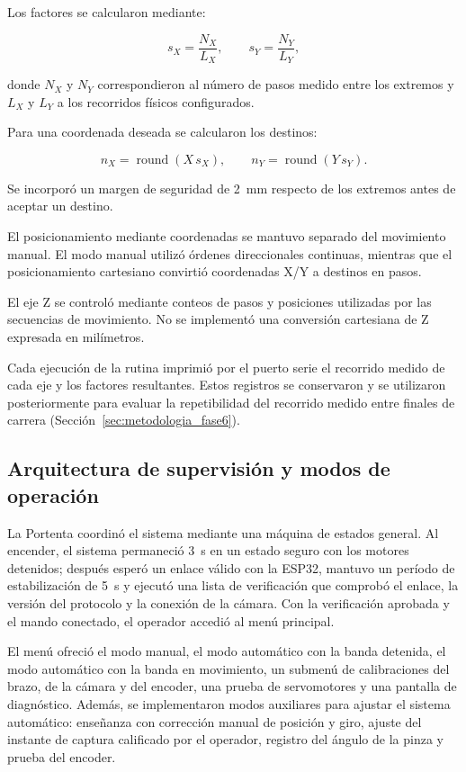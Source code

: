 Los factores se calcularon mediante:

\[
s_X=\frac{N_X}{L_X},
\qquad
s_Y=\frac{N_Y}{L_Y},
\]

donde $N_X$ y $N_Y$ correspondieron al número de pasos medido entre los extremos y $L_X$ y $L_Y$ a los recorridos físicos configurados.

Para una coordenada deseada se calcularon los destinos:

\[
n_X=\operatorname{round}(X\,s_X),
\qquad
n_Y=\operatorname{round}(Y\,s_Y).
\]

Se incorporó un margen de seguridad de 2~mm respecto de los extremos antes de aceptar un destino.

El posicionamiento mediante coordenadas se mantuvo separado del movimiento manual. El modo manual utilizó órdenes direccionales continuas, mientras que el posicionamiento cartesiano convirtió coordenadas X/Y a destinos en pasos.

El eje Z se controló mediante conteos de pasos y posiciones utilizadas por las secuencias de movimiento. No se implementó una conversión cartesiana de Z expresada en milímetros.

Cada ejecución de la rutina imprimió por el puerto serie el recorrido medido de cada eje y los factores resultantes. Estos registros se conservaron y se utilizaron posteriormente para evaluar la repetibilidad del recorrido medido entre finales de carrera (Sección~\ref{sec:metodologia_fase6}).


\subsection{Arquitectura de supervisión y modos de operación}

La Portenta coordinó el sistema mediante una máquina de estados general. Al encender, el sistema permaneció 3~s en un estado seguro con los motores detenidos; después esperó un enlace válido con la ESP32, mantuvo un período de estabilización de 5~s y ejecutó una lista de verificación que comprobó el enlace, la versión del protocolo y la conexión de la cámara. Con la verificación aprobada y el mando conectado, el operador accedió al menú principal.

El menú ofreció el modo manual, el modo automático con la banda detenida, el modo automático con la banda en movimiento, un submenú de calibraciones del brazo, de la cámara y del encoder, una prueba de servomotores y una pantalla de diagnóstico. Además, se implementaron modos auxiliares para ajustar el sistema automático: enseñanza con corrección manual de posición y giro, ajuste del instante de captura calificado por el operador, registro del ángulo de la pinza y prueba del encoder.

